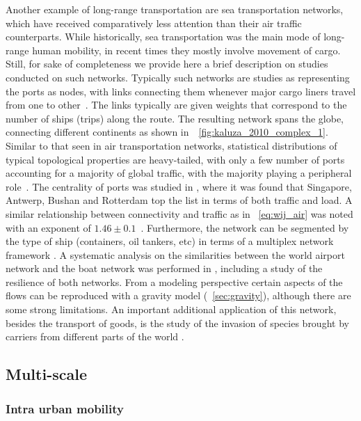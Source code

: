 Another example of long-range transportation are sea transportation networks, which have received comparatively less attention than their air traffic counterparts. While historically, sea transportation was the main mode of long-range human mobility, in recent times they mostly involve movement of cargo. Still, for sake of completeness we provide here a brief description on studies conducted on such networks. Typically such networks are studies as representing the ports as nodes, with links connecting them whenever major cargo liners travel from one to other~\cite{fremont_2007_global}. The links typically are given weights that correspond to the number of ships (trips) along the route. The resulting network spans the globe, connecting different continents as shown in~\figurename~\ref{fig:kaluza_2010_complex_1}. Similar to that seen in air transportation networks, statistical distributions of typical topological properties are heavy-tailed, with only a few number of ports accounting for a majority of global traffic, with the majority playing a peripheral role~\cite{kaluza_2010_complex}. The centrality of  ports was studied in \cite{hu_2009_empirical}, where it was found that Singapore, Antwerp, Bushan and Rotterdam top the list in terms of both traffic and load. A similar relationship between connectivity and traffic as in \equationname~\eqref{eq:wij_air} was noted with an exponent of $1.46 \pm 0.1$~\cite{kaluza_2010_complex}. Furthermore, the network can be segmented by the type of ship (containers, oil tankers, etc) in terms of a multiplex network framework \cite{ducruet_2013_network}.  A systematic analysis on the similarities between the world airport network and the boat network was performed in \cite{woolley-meza_2011_complexity}, including a study of the resilience of both networks. From a modeling perspective certain aspects of the flows can be reproduced with a gravity model (\sectionname~\ref{sec:gravity}), although there are some strong limitations. An important additional application of this network, besides the transport of goods, is the study of the invasion of species brought by carriers from different parts of the world \cite{keller_2010_linking,seebens_2013_risk}. 


\subsection{Multi-scale}

\subsubsection{Intra urban mobility}

